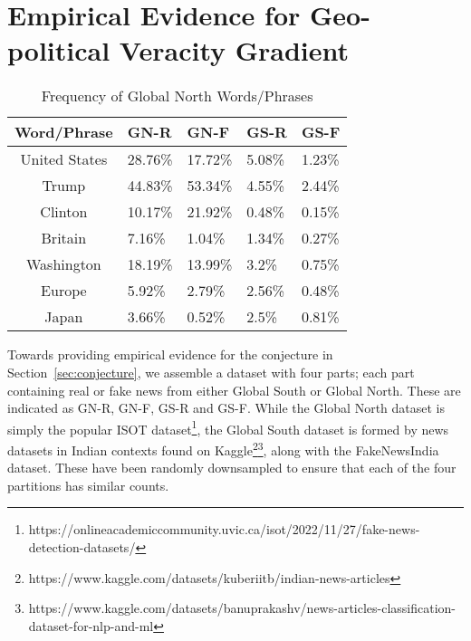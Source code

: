 \documentclass[runningheads]{llncs}
\begin{document}
\section{Empirical Evidence for Geo-political Veracity Gradient}

\begin{wraptable}{r}{8.5cm}
\vspace{-0.6in}
\begin{center}
\begin{tabular}{ |c|p{1.2cm}|p{1.2cm}|p{1.2cm}|p{1.2cm}|} 
  \hline
  {\bf Word/Phrase} & {\bf GN-R} & {\bf GN-F} & {\bf GS-R} & {\bf GS-F} \\
  \hline
  \hline
  United States & 28.76\% & 17.72\% & 5.08\% & 1.23\% \\
  Trump & 44.83\% & 53.34\% & 4.55\% & 2.44\% \\
  Clinton & 10.17\% & 21.92\% & 0.48\% & 0.15\% \\
  Britain & 7.16\% & 1.04\% & 1.34\% & 0.27\% \\
  Washington & 18.19\% & 13.99\% & 3.2\% & 0.75\% \\
  Europe & 5.92\% & 2.79\% & 2.56\% & 0.48\% \\
  Japan & 3.66\% & 0.52\% & 2.5\% & 0.81\% \\
  \hline
\end{tabular}
\caption{Frequency of Global North Words/Phrases}
\label{tab:freq}
\end{center}
\vspace{-0.4in}
\end{wraptable}

Towards providing empirical evidence for the conjecture in Section~\ref{sec:conjecture}, we assemble a dataset with four parts; each part containing real or fake news from either Global South or Global North. These are indicated as GN-R, GN-F, GS-R and GS-F. While the Global North dataset is simply the popular ISOT dataset\footnote{{\tiny https://onlineacademiccommunity.uvic.ca/isot/2022/11/27/fake-news-detection-datasets/}}, the Global South dataset is formed by news datasets in Indian contexts found on Kaggle\footnote{https://www.kaggle.com/datasets/kuberiitb/indian-news-articles}\footnote{https://www.kaggle.com/datasets/banuprakashv/news-articles-classification-dataset-for-nlp-and-ml}, along with the FakeNewsIndia dataset\cite{DHAWAN2022130}. These have been randomly downsampled to ensure that each of the four partitions has similar counts. 
\end{document}
